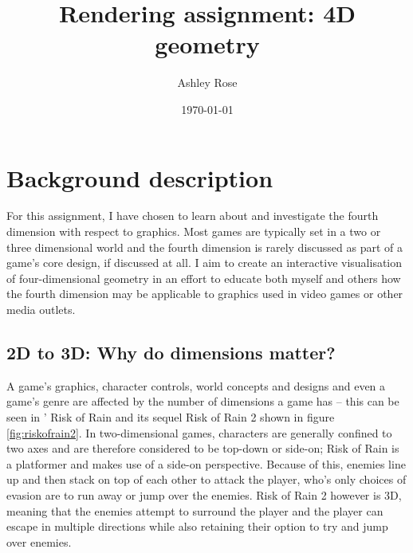 \documentclass[11pt, a4paper]{article}
\begin{document}
\title{\titlefont Rendering assignment: 4D geometry}
\author{Ashley Rose}
\date{\today}
\maketitle
\thispagestyle{empty}


\cleardoublepage
\setcounter{page}{1}
\tableofcontents

\cleardoublepage
{}
\setcounter{page}{1}

\section{Background description}

For this assignment, I have chosen to learn about and investigate the fourth dimension with respect to graphics. Most games are typically set in a two or three dimensional world and the fourth dimension is rarely discussed as part of a game's core design, if discussed at all. I aim to create an interactive visualisation of four-dimensional geometry in an effort to educate both myself and others how the fourth dimension may be applicable to graphics used in video games or other media outlets.

\subsection{2D to 3D: Why do dimensions matter?}

A game's graphics, character controls, world concepts and designs and even a game's genre are affected by the number of dimensions a game has -- this can be seen in \citeauthor*{riskofrain}' Risk of Rain \parencite*{riskofrain} and its sequel Risk of Rain 2 \parencite{riskofrain2} shown in figure \ref{fig:riskofrain2}. In two-dimensional games, characters are generally confined to two axes and are therefore considered to be top-down or side-on; Risk of Rain is a platformer and makes use of a side-on perspective. Because of this, enemies line up and then stack on top of each other to attack the player, who's only choices of evasion are to run away or jump over the enemies. Risk of Rain 2 however is 3D, meaning that the enemies attempt to surround the player and the player can escape in multiple directions while also retaining their option to try and jump over enemies.
\end{document}
